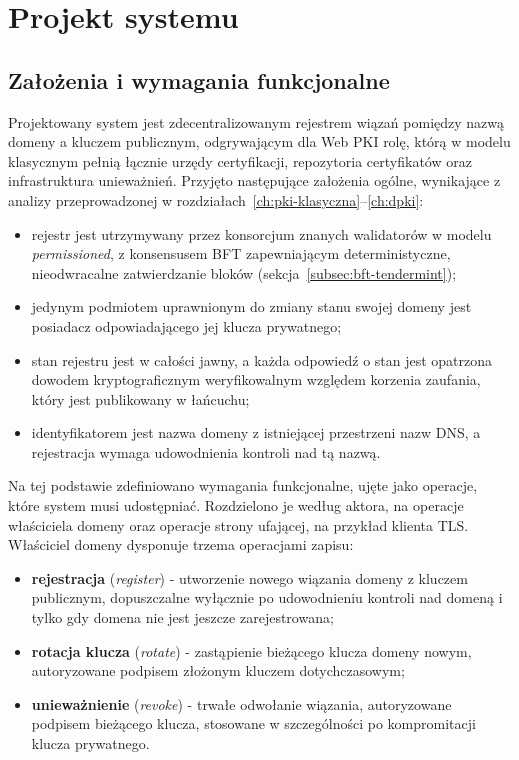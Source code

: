 \chapter{Projekt systemu}
\label{ch:projekt}

\section{Założenia i wymagania funkcjonalne}
\label{sec:wymagania-funkcjonalne}

Projektowany system jest zdecentralizowanym rejestrem wiązań pomiędzy nazwą domeny a kluczem publicznym, odgrywającym dla Web PKI rolę, którą w modelu klasycznym pełnią łącznie urzędy certyfikacji, repozytoria certyfikatów oraz infrastruktura unieważnień. Przyjęto następujące założenia ogólne, wynikające z analizy przeprowadzonej w rozdziałach~\ref{ch:pki-klasyczna}--\ref{ch:dpki}:
\begin{itemize}
    \item rejestr jest utrzymywany przez konsorcjum znanych walidatorów w modelu \emph{permissioned}, z konsensusem BFT zapewniającym deterministyczne, nieodwracalne zatwierdzanie bloków (sekcja~\ref{subsec:bft-tendermint});
    \item jedynym podmiotem uprawnionym do zmiany stanu swojej domeny jest posiadacz odpowiadającego jej klucza prywatnego;
    \item stan rejestru jest w całości jawny, a każda odpowiedź o stan jest opatrzona dowodem kryptograficznym weryfikowalnym względem korzenia zaufania, który jest publikowany w łańcuchu;
    \item identyfikatorem jest nazwa domeny z istniejącej przestrzeni nazw DNS, a rejestracja wymaga udowodnienia kontroli nad tą nazwą.
\end{itemize}

Na tej podstawie zdefiniowano wymagania funkcjonalne, ujęte jako operacje, które system musi udostępniać. Rozdzielono je według aktora, na operacje właściciela domeny oraz operacje strony ufającej, na przykład klienta TLS. Właściciel domeny dysponuje trzema operacjami zapisu:
\begin{itemize}
    \item \textbf{rejestracja} (\emph{register}) - utworzenie nowego wiązania domeny z kluczem publicznym, dopuszczalne wyłącznie po udowodnieniu kontroli nad domeną i tylko gdy domena nie jest jeszcze zarejestrowana;
    \item \textbf{rotacja klucza} (\emph{rotate}) - zastąpienie bieżącego klucza domeny nowym, autoryzowane podpisem złożonym kluczem dotychczasowym;
    \item \textbf{unieważnienie} (\emph{revoke}) - trwałe odwołanie wiązania, autoryzowane podpisem bieżącego klucza, stosowane w szczególności po kompromitacji klucza prywatnego.
\end{itemize}

